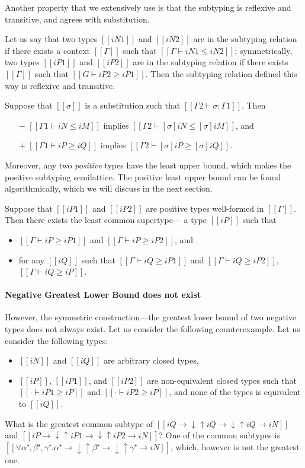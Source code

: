 Another property that we extensively use is that the subtyping is reflexive and transitive,
and agrees with substitution.

\begin{property}
  Let us say that two types $[[iN1]]$ and $[[iN2]]$ are in the subtyping relation if there 
  exists a context $[[Γ]]$ such that $[[Γ ⊢ iN1 ≤ iN2]]$;
  symmetrically, two types $[[iP1]]$ and $[[iP2]]$ are in the subtyping relation
  if there exists $[[Γ]]$ such that $[[G ⊢ iP2 ≥ iP1]]$.
  Then the subtyping relation defined this way is reflexive and transitive.
\end{property}

\begin{property}
  Suppose that  $[[σ]]$ is a substitution such that $[[Γ2 ⊢ σ : Γ1]]$. 
  Then
  \begin{enumerate}
    \item [$-$] $[[Γ1 ⊢ iN ≤ iM]]$ implies $[[Γ2 ⊢ [σ]iN ≤ [σ]iM]]$, and
    \item [$+$] $[[Γ1 ⊢ iP ≥ iQ]]$ implies $[[Γ2 ⊢ [σ]iP ≥ [σ]iQ]]$.
  \end{enumerate}
\end{property}

Moreover, any two \emph{positive} types have the least upper bound, which makes
the positive subtyping semilattice.
The positive least upper bound can be found algorithmically,
which we will discuss in the next section.

\begin{property}
  Suppose that $[[iP1]]$ and $[[iP2]]$ are positive types
  well-formed in $[[Γ]]$.
  Then there exists the least common supertype--- a type $[[iP]]$ such that
  \begin{itemize}
    \item $[[Γ ⊢ iP ≥ iP1]]$ and $[[Γ ⊢ iP ≥ iP2]]$, and 
    \item for any $[[iQ]]$ such that $[[Γ ⊢ iQ ≥ iP1]]$ and $[[Γ ⊢ iQ ≥ iP2]]$,
      $[[Γ ⊢ iQ ≥ iP]]$.
  \end{itemize}
\end{property}

\paragraph{Negative Greatest Lower Bound does not exist}
However, the symmetric construction---the greatest lower bound of two negative types
does not always exist. Let us consider the following counterexample.
Let us consider the following types: 
\begin{itemize}
  \item $[[iN]]$ and $[[iQ]]$ are arbitrary closed types, 
  \item $[[iP]]$, $[[iP1]]$, and $[[iP2]]$ are non-equivalent closed types 
    such that $[[· ⊢ iP1 ≥ iP]]$ and $[[· ⊢ iP2 ≥ iP]]$, and 
    none of the types is equivalent to $[[iQ]]$.
\end{itemize}
What is the greatest common subtype of  
$[[iQ → ↓↑iQ → ↓↑iQ → iN]]$ and $[[iP → ↓↑iP1 → ↓↑iP2 → iN]]$?
One of the common subtypes is $[[∀α⁺,β⁺,γ⁺. α⁺ → ↓↑β⁺ → ↓↑γ⁺ → iN]]$,
which, however is not the greatest one.  


